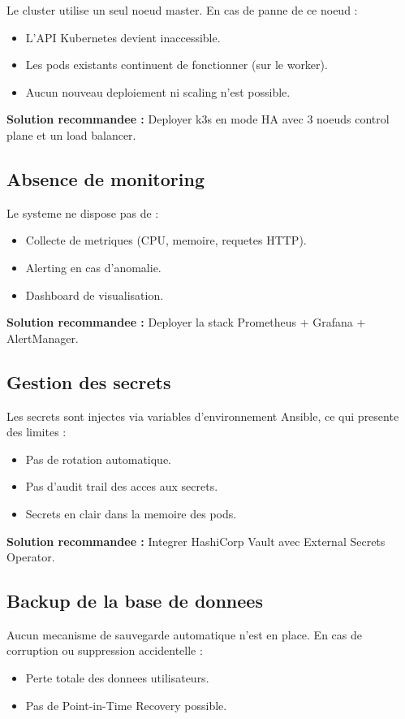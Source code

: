 \documentclass[12pt,a4paper,french]{report}
\begin{document}
Le cluster utilise un seul noeud master. En cas de panne de ce noeud :
\begin{itemize}
    \item L'API Kubernetes devient inaccessible.
    \item Les pods existants continuent de fonctionner (sur le worker).
    \item Aucun nouveau deploiement ni scaling n'est possible.
\end{itemize}

\textbf{Solution recommandee :} Deployer k3s en mode HA avec 3 noeuds control plane et un load balancer.

\subsection{Absence de monitoring}

Le systeme ne dispose pas de :
\begin{itemize}
    \item Collecte de metriques (CPU, memoire, requetes HTTP).
    \item Alerting en cas d'anomalie.
    \item Dashboard de visualisation.
\end{itemize}

\textbf{Solution recommandee :} Deployer la stack Prometheus + Grafana + AlertManager.

\subsection{Gestion des secrets}

Les secrets sont injectes via variables d'environnement Ansible, ce qui presente des limites :
\begin{itemize}
    \item Pas de rotation automatique.
    \item Pas d'audit trail des acces aux secrets.
    \item Secrets en clair dans la memoire des pods.
\end{itemize}

\textbf{Solution recommandee :} Integrer HashiCorp Vault avec External Secrets Operator.

\subsection{Backup de la base de donnees}

Aucun mecanisme de sauvegarde automatique n'est en place. En cas de corruption ou suppression accidentelle :
\begin{itemize}
    \item Perte totale des donnees utilisateurs.
    \item Pas de Point-in-Time Recovery possible.
\end{itemize}
\end{document}
